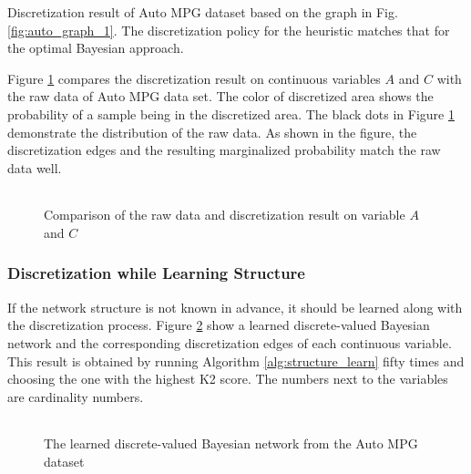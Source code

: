 \begin{table}[h]
  \centering
  
  \caption{Discretization result of Auto MPG dataset based on the graph in Fig. \ref{fig:auto_graph_1}. The discretization policy for the heuristic matches that for the optimal Bayesian approach. }
  \label{table:auto_disc_table_1}
\end{table}

Figure \ref{fig:auto_exp1_distr_1_3} compares the discretization result on continuous variables $A$ and $C$ with the raw data of Auto MPG data set. The color of discretized area shows the probability of a sample being in the discretized area. The black dots in Figure \ref{fig:auto_exp1_distr_1_3} demonstrate the distribution of the raw data. As shown in the figure, the discretization edges and the resulting marginalized probability match the raw data well.

\begin{figure}[ht]
    \begin{tabular}{cc}
      
    \end{tabular}
  \caption{Comparison of the raw data and discretization result on variable $A$ and $C$}
  \label{fig:auto_exp1_distr_1_3}
\end{figure}

\subsubsection{Discretization while Learning Structure}
\label{subsubsec:auto_exp2}

If the network structure is not known in advance, it should be learned along with the discretization process. Figure \ref{fig:auto_graph_2} show a learned discrete-valued Bayesian network and the corresponding discretization edges of each continuous variable. This result is obtained by running Algorithm \ref{alg:structure_learn} fifty times and choosing the one with the highest K2 score. The numbers next to the variables are cardinality numbers.


\begin{figure}[ht]
\centering
    \begin{tabular}{cc}
      
    \end{tabular}
  \caption{The learned discrete-valued Bayesian network from the Auto MPG dataset}
  \label{fig:auto_graph_2}
\end{figure}

